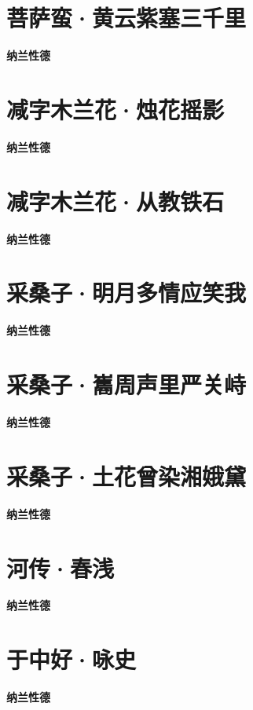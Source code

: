 \documentclass[12pt,a4paper]{ctexbook}
\begin{document}
\section{菩萨蛮·黄云紫塞三千里}
\textbf{纳兰性德}\par\vspace{0.5em}

\section{减字木兰花·烛花摇影}
\textbf{纳兰性德}\par\vspace{0.5em}

\section{减字木兰花·从教铁石}
\textbf{纳兰性德}\par\vspace{0.5em}

\section{采桑子·明月多情应笑我}
\textbf{纳兰性德}\par\vspace{0.5em}

\section{采桑子·巂周声里严关峙}
\textbf{纳兰性德}\par\vspace{0.5em}

\section{采桑子·土花曾染湘娥黛}
\textbf{纳兰性德}\par\vspace{0.5em}

\section{河传·春浅}
\textbf{纳兰性德}\par\vspace{0.5em}

\section{于中好·咏史}
\textbf{纳兰性德}\par\vspace{0.5em}
\end{document}
